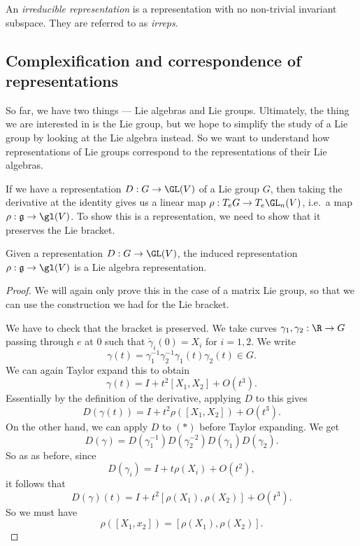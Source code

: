 \documentclass[a4paper]{article}
\begin{document}
\begin{defi}
  An \emph{irreducible representation} is a representation with no non-trivial invariant subspace. They are referred to as \emph{irreps}.
\end{defi}

\subsection{Complexification and correspondence of representations}
So far, we have two things --- Lie algebras and Lie groups. Ultimately, the thing we are interested in is the Lie group, but we hope to simplify the study of a Lie group by looking at the Lie algebra instead. So we want to understand how representations of Lie groups correspond to the representations of their Lie algebras.

If we have a representation $D: G \to \GL(V)$ of a Lie group $G$, then taking the derivative at the identity gives us a linear map $\rho: T_e G \to T_e \GL_n(V)$, i.e.\ a map $\rho: \mathfrak{g} \to \gl(V)$. To show this is a representation, we need to show that it preserves the Lie bracket.

\begin{lemma}
  Given a representation $D: G \to \GL(V)$, the induced representation $\rho: \mathfrak{g} \to \gl(V)$ is a Lie algebra representation.
\end{lemma}

\begin{proof}
  We will again only prove this in the case of a matrix Lie group, so that we can use the construction we had for the Lie bracket.

  We have to check that the bracket is preserved. We take curves $\gamma_1, \gamma_2: \R \to G$ passing through $e$ at $0$ such that $\dot{\gamma}_i(0) = X_i$ for $i = 1, 2$. We write
  \[
    \gamma(t) = \gamma_1^{-1} \gamma_2^{-1}\gamma_1(t)\gamma_2(t) \in G.
  \]
  We can again Taylor expand this to obtain
  \[
    \gamma(t) = I + t^2 [X_1, X_2] + O(t^3).
  \]
  Essentially by the definition of the derivative, applying $D$ to this gives
  \[
    D(\gamma(t)) = I + t^2 \rho([X_1, X_2]) + O(t^3).
  \]
  On the other hand, we can apply $D$ to $(*)$ before Taylor expanding. We get
  \[
    D(\gamma) = D(\gamma_1^{-1}) D(\gamma_2^{-2}) D(\gamma_1) D(\gamma_2).
  \]
  So as as before, since
  \[
    D(\gamma_i) = I + t \rho(X_i) + O(t^2),
  \]
  it follows that
  \[
    D(\gamma)(t) = I + t^2 [\rho(X_1), \rho(X_2)] + O(t^3).
  \]
  So we must have
  \[
    \rho([X_1, x_2]) = [\rho(X_1), \rho(X_2)].
  \]
\end{proof}
\end{document}
